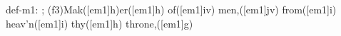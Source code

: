 def-m1: \grealign;
(f3)Mak([em1]h)er([em1]h) of([em1]iv) men,([em1]jv) from([em1]i) heav'n([em1]i) thy([em1]h) throne,([em1]g)